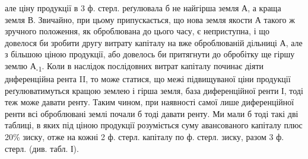 \parcont{}  %
але ціну продукції в 3 ф. стерл. реґулювала б не найгірша земля А, а краща
земля В. Звичайно, при цьому припускається, що нова земля якости А такого
ж зручного положення, як оброблювана до цього часу, є неприступна, і що довелося
би зробити другу витрату капіталу на вже оброблюваній дільниці А, але
з більшою ціною продукції, або довелось би притягнути до обробітку ще гіршу
землю А\textsubscript{-1}. Коли в наслідок послідовних витрат капіталу починає діяти днференційна
рента II, то може статися, що межі підвищуваної ціни продукції реґулюватимуться
кращою землею і гірша земля, база диференційної ренти І, тоді
теж може давати ренту. Таким чином, при наявності самої лише диференційної
ренти всі оброблювані землі почали б тоді давати ренту. Ми мали б тоді такі
дві таблиці, в яких під ціною продукції розуміється суму авансованого капіталу
плюс 20\%  зиску, отже на кожні 2 ф. стерл. капіталу по  ф. стерл.
зиску, разом 3 ф. стерл. (див. табл. І).

